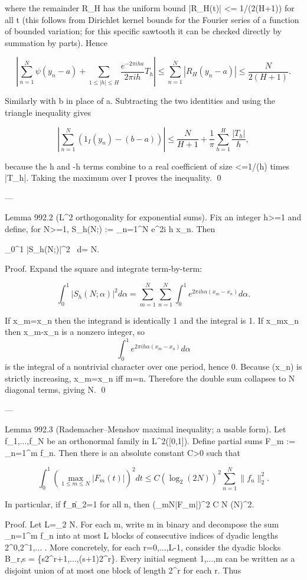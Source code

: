 where the remainder R_H has the uniform bound
  |R_H(t)| <= 1/(2(H+1))
for all t (this follows from Dirichlet kernel bounds for the Fourier series of a function
of bounded variation; for this specific sawtooth it can be checked directly by summation
by parts).
Hence

\[
  \left|\sum_{n=1}^N \psi(y_n-a) + \sum_{1\le |h|\le H} \frac{e^{-2\pi i h a}}{2\pi i h} T_h\right|
  \le \sum_{n=1}^N |R_H(y_n-a)| \le \frac{N}{2(H+1)}.
\]

Similarly with b in place of a. Subtracting the two identities and using the triangle
inequality gives

\[
  \left|\sum_{n=1}^N (1_I(y_n)-(b-a))\right|
  \le \frac{N}{H+1} + \frac{1}{\pi} \sum_{h=1}^H \frac{|T_h|}{h},
\]

because the h and -h terms combine to a real coefficient of size <=1/(\pi h) times |T_h|.
Taking the maximum over I proves the inequality.
\qed

---

Lemma 992.2 (L^2 orthogonality for exponential sums).
Fix an integer h>=1 and define, for N>=1,
  S_h(N;\alpha) := \sum_{n=1}^N e^{2\pi i h \alpha x_n}.
Then

  \int_0^1 |S_h(N;\alpha)|^2 \, d\alpha = N.

Proof.
Expand the square and integrate term-by-term:

\[
  \int_0^1 |S_h(N;\alpha)|^2 d\alpha
  = \sum_{m=1}^N \sum_{n=1}^N \int_0^1 e^{2\pi i h \alpha (x_m-x_n)} d\alpha.
\]

If x_m=x_n then the integrand is identically 1 and the integral is 1.
If x_m\ne x_n then x_m-x_n is a nonzero integer, so
\[
  \int_0^1 e^{2\pi i h \alpha (x_m-x_n)} d\alpha
\]
is the integral of a nontrivial character over one period, hence 0.
Because (x_n) is strictly increasing, x_m=x_n iff m=n. Therefore the double sum collapses
to N diagonal terms, giving N.
\qed

---

Lemma 992.3 (Rademacher--Menshov maximal inequality; a usable form).
Let f_1,...,f_N be an orthonormal family in L^2([0,1]). Define partial sums
  F_m := \sum_{n=1}^m f_n.
Then there is an absolute constant C>0 such that

\[
  \int_0^1 \left(\max_{1\le m\le N} |F_m(t)|\right)^2 dt \le C (\log_2(2N))^2 \sum_{n=1}^N \|f_n\|_2^2.
\]

In particular, if \|f_n\|_2=1 for all n, then
  \int (\max_{m\le N}|F_m|)^2 \le C N (\log N)^2.

Proof.
Let L=\lceil \log_2 N\rceil.
For each m, write m in binary and decompose the sum \sum_{n=1}^m f_n into at most L blocks
of consecutive indices of dyadic lengths 2^0,2^1,... . More concretely, for each r=0,...,L-1,
consider the dyadic blocks B_{r,s} = \{s2^r+1,...,(s+1)2^r\}.
Every initial segment {1,...,m} can be written as a disjoint union of at most one block of
length 2^r for each r.
Thus

